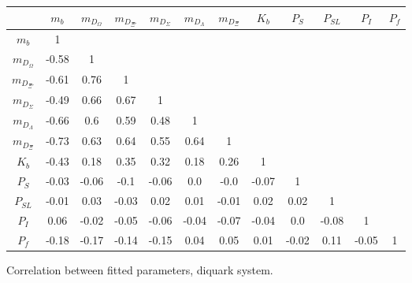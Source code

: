 \begin{tabular}{c | c c c c c c c c c c c}\hline \hline
         &  $m_{b}$ & $m_{D_{\Omega}}$ & $m_{D_{\Xi'}}$ & $m_{D_{\Sigma}}$ & $m_{D_{\Lambda}}$ & $m_{D_{\Xi}}$ &  $K_b$   & $P_S$ & $P_{SL}$ & $P_{I}$ & $P_f$ \\ \hline
 $m_{b}$ &     1   &   &   &   &    &   &   &  & & &  \\ 
$m_{D_{\Omega}}$ & -0.58 &  1   &   &  &   &   &   &    &   &   &  \\ 
$m_{D_{\Xi'}}$ & -0.61 & 0.76 &  1   &   &   &   &  &  &  &  & \\ 
$m_{D_{\Sigma}}$ & -0.49 & 0.66 & 0.67 &  1   &   &   &   &   &   &  &  \\ 
$m_{D_{\Lambda}}$ & -0.66 & 0.6 & 0.59 & 0.48 &  1   &   &   &   &    &   &  \\ 
$m_{D_{\Xi}}$ & -0.73 & 0.63 & 0.64 & 0.55 & 0.64 &  1   &   &   &   &    &   \\ 
 $K_b$   & -0.43 & 0.18 & 0.35 & 0.32 & 0.18 & 0.26 & 1   &   &   &   & \\ 
 $P_S$   & -0.03 & -0.06 & -0.1 & -0.06 & 0.0 & -0.0 & -0.07 & 1   &   &   & \\ 
 $P_{SL}$& -0.01 & 0.03 & -0.03 & 0.02 & 0.01 & -0.01 & 0.02 & 0.02 & 1   &   &  \\ 
 $P_I$   & 0.06 & -0.02 & -0.05 & -0.06 & -0.04 & -0.07 & -0.04 & 0.0 & -0.08 & 1   & \\ 
 $P_f$   & -0.18 & -0.17 & -0.14 & -0.15 & 0.04 & 0.05 & 0.01 & -0.02 & 0.11 & -0.05 & 1 \\ \hline \hline
\end{tabular}
\caption{Correlation between fitted parameters, diquark system.}
\label{tab:diquark_corr}
